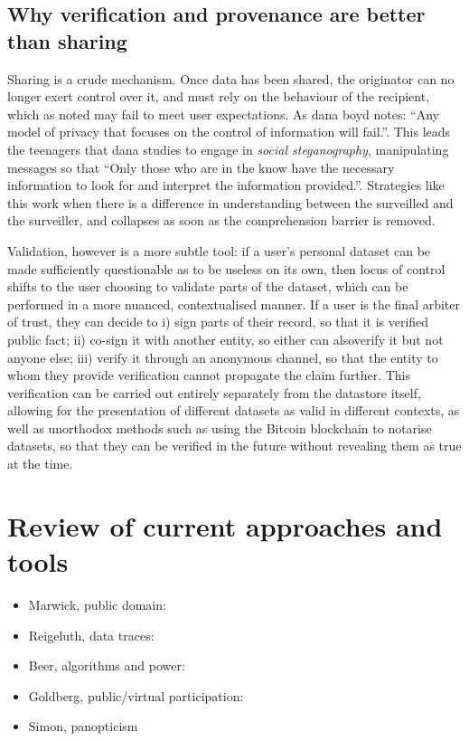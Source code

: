\documentclass{IOS-Book-Article}     %
\newcommand{\tbox}[3][red]{{
\color{#1}\noindent{
   \fbox{\scriptsize{ {\bf #2} \textsl{#3}}}
   \vspace{2pt}
}
}}
\newcommand{\todo}[1]{\tbox{TODO:}{#1}}
\begin{document}
\subsection{Why verification and provenance are better than sharing}

Sharing is a crude mechanism. Once data has been shared, the originator can no
longer exert control over it, and must rely on the behaviour of the recipient,
which as noted may fail to meet user expectations. As dana boyd
notes: ``Any model of privacy that focuses on the control of information will
fail.''. This leads the teenagers that dana studies to
engage in \emph{social steganography}, manipulating messages so that ``Only 
those who are in the know have the necessary information to look for and interpret the information 
provided.''\cite{boyd2012Networked}. Strategies like this work when there is a
difference in understanding between the surveilled and the surveiller, and
collapses as soon as the comprehension barrier is removed.

Validation, however is a more subtle tool:
if a user’s personal dataset can be made sufficiently questionable as to be useless on its own,
then locus of control shifts to the user choosing to validate parts of the dataset,
which can be performed in a more nuanced,
contextualised manner. If a user is the final arbiter of trust, they can decide
to i) sign parts of their record, so that it is verified public fact; ii)
co-sign it with another entity, so either can  alsoverify it but not anyone 
else;
iii) verify it through an anonymous channel, so that the entity to whom they
provide verification cannot propagate the claim further. This verification can
be carried out entirely separately from the datastore itself, allowing for the
presentation of different datasets as valid  in different contexts, as well as
unorthodox methods such as using the Bitcoin blockchain to notarise datasets, so
that they can be verified in the future without revealing them as true at the
time.

\section{Review of current approaches and tools} 
\todo{Max to do some writing}

\todo{Refs to work in\ldots}
\begin{itemize}
  \item Marwick, public domain: \cite{marwick2012Public}
  \item Reigeluth, data traces: \cite{reigeluth2014Data}
  \item Beer, algorithms and power: \cite{beer2009Algorithm}
  \item Goldberg, public/virtual participation: \cite{goldberg2010Rethinking}
  \item Simon, panopticism \cite{simon2005Panopticism}
\end{itemize}
\end{document}
